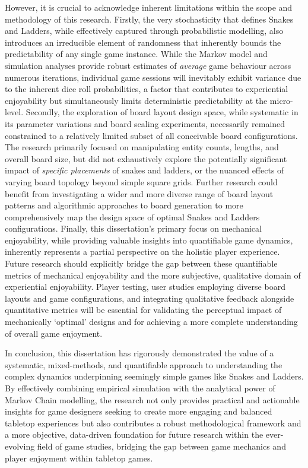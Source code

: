 However, it is crucial to acknowledge inherent limitations within the scope and methodology of this research.  Firstly, the very stochasticity that defines Snakes and Ladders, while effectively captured through probabilistic modelling, also introduces an irreducible element of randomness that inherently bounds the predictability of any single game instance.  While the Markov model and simulation analyses provide robust estimates of \textit{average} game behaviour across numerous iterations, individual game sessions will inevitably exhibit variance due to the inherent dice roll probabilities, a factor that contributes to experiential enjoyability but simultaneously limits deterministic predictability at the micro-level.  Secondly, the exploration of board layout design space, while systematic in its parameter variations and board scaling experiments, necessarily remained constrained to a relatively limited subset of all conceivable board configurations.  The research primarily focused on manipulating entity counts, lengths, and overall board size, but did not exhaustively explore the potentially significant impact of \textit{specific placements} of snakes and ladders, or the nuanced effects of varying board topology beyond simple square grids.  Further research could benefit from investigating a wider and more diverse range of board layout patterns and algorithmic approaches to board generation to more comprehensively map the design space of optimal Snakes and Ladders configurations.  Finally, this dissertation’s primary focus on mechanical enjoyability, while providing valuable insights into quantifiable game dynamics, inherently represents a partial perspective on the holistic player experience.  Future research should explicitly bridge the gap between these quantifiable metrics of mechanical enjoyability and the more subjective, qualitative domain of experiential enjoyability.  Player testing, user studies employing diverse board layouts and game configurations, and integrating qualitative feedback alongside quantitative metrics will be essential for validating the perceptual impact of mechanically ‘optimal’ designs and for achieving a more complete understanding of overall game enjoyment.

In conclusion, this dissertation has rigorously demonstrated the value of a systematic, mixed-methods, and quantifiable approach to understanding the complex dynamics underpinning seemingly simple games like Snakes and Ladders. By effectively combining empirical simulation with the analytical power of Markov Chain modelling, the research not only provides practical and actionable insights for game designers seeking to create more engaging and balanced tabletop experiences but also contributes a robust methodological framework and a more objective, data-driven foundation for future research within the ever-evolving field of game studies, bridging the gap between game mechanics and player enjoyment within tabletop games.